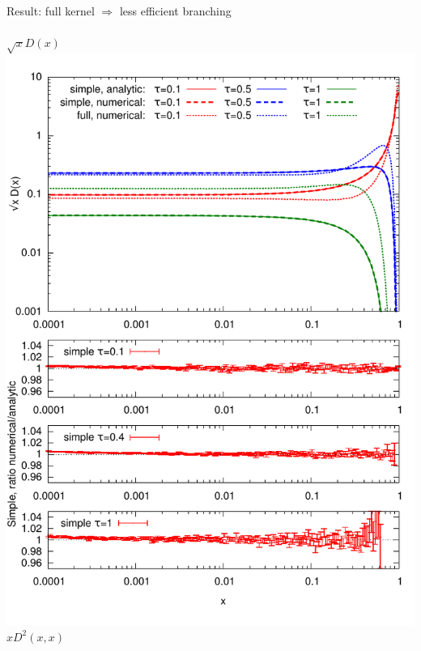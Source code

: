 \documentclass[pstricks,mathserif]{beamer}
\begin{document}
\begin{frame}

Result: full kernel $\Rightarrow$ less efficient branching\\
~\\



\centering
\small $\sqrt{x} D(x)$
\includegraphics[width=1\linewidth]{times.pdf}
\endminipage\hfill
{}
\centering
\small $x D^2(x,x)$

\end{frame}
\end{document}
